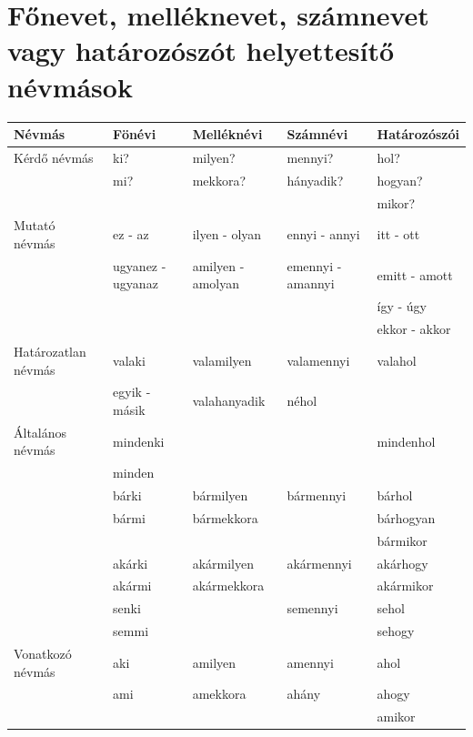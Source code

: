 \documentclass{article}
\begin{document}
\section{Főnevet, melléknevet, számnevet vagy határozószót helyettesítő névmások}
\begin{tabular}{|l|l|l|l|l|}
\hline
     Névmás & Fönévi & Melléknévi & Számnévi & Határozószói \\ \hline
     Kérdő névmás & ki? & milyen? & mennyi? & hol? \\
     & mi? & mekkora? & hányadik? & hogyan? \\ 
     & & & & mikor? \\ \hline
     Mutató névmás & ez - az & ilyen - olyan & ennyi - annyi & itt - ott \\
     & ugyanez - ugyanaz & amilyen -  amolyan & emennyi - amannyi & emitt - amott \\ 
     & & & & így - úgy \\
     & & & & ekkor - akkor \\ \hline
     Határozatlan névmás & valaki & valamilyen & valamennyi & valahol \\
     & egyik - másik & valahanyadik & néhol & \\ \hline
     Általános névmás & mindenki & & & mindenhol \\ 
     & minden & & & \\
     & bárki & bármilyen & bármennyi & bárhol \\
     & bármi & bármekkora  &  & bárhogyan \\
     & & & & bármikor \\ 
     & akárki & akármilyen & akármennyi & akárhogy \\
     & akármi & akármekkora & & akármikor \\
     & senki & & semennyi & sehol \\
     & semmi & & & sehogy \\ \hline
     Vonatkozó névmás & aki & amilyen & amennyi & ahol \\
     & ami & amekkora & ahány & ahogy \\
     & & & & amikor \\ \hline
     
\end{tabular}
\end{document}
